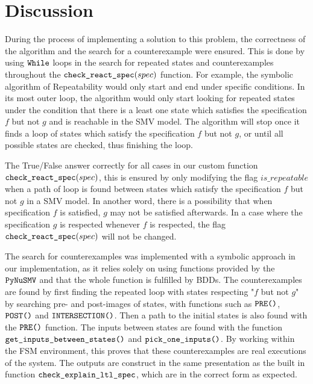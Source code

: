 \section{Discussion}

During the process of implementing a solution to this problem, the correctness of the algorithm and the search for a counterexample were ensured. This is done by using $\verb|While|$ loops in the search for repeated states and counterexamples throughout the $\verb|check_react_spec|(spec)$ function. For example, the symbolic algorithm of Repeatability would only start and end under specific conditions. In its most outer loop, the algorithm would only start looking for repeated states under the condition that there is a least one state which satisfies the specification $f$ but not $g$ and is reachable in the SMV model. The algorithm will stop once it finds a loop of states which satisfy the specification $f$ but not $g$, or until all possible states are checked, thus finishing the loop.

\medskip

The True/False answer correctly for all cases in our custom function $\verb|check_react_spec|(spec)$, this is ensured by only modifying the flag $is\_repeatable$ when a path of loop is found between states which satisfy the specification $f$ but not $g$ in a SMV model. In another word, there is a possibility that when specification $f$ is satisfied, $g$ may not be satisfied afterwards. In a case where the specification $g$ is respected whenever $f$ is respected, the flag $\verb|check_react_spec|(spec)$ will not be changed.

\medskip

The search for counterexamples was implemented with a symbolic approach in our implementation, as it relies solely on using functions provided by the $\verb|PyNuSMV|$ and that the whole function is fulfilled by BDDs. The counterexamples are found by first finding the repeated loop with states respecting "$f$ but not $g$" by searching pre- and post-images of states, with functions such as $\verb|PRE()|$, $\verb|POST()|$ and $\verb|INTERSECTION()|$. Then a path to the initial states is also found with the $\verb|PRE()|$ function. The inputs between states are found with the function $\verb|get_inputs_between_states()|$ and $\verb|pick_one_inputs()|$. By working within the FSM environment, this proves that these counterexamples are real executions of the system. The outputs are construct in the same presentation as the built in function $\verb|check_explain_ltl_spec|$, which are in the correct form as expected.

